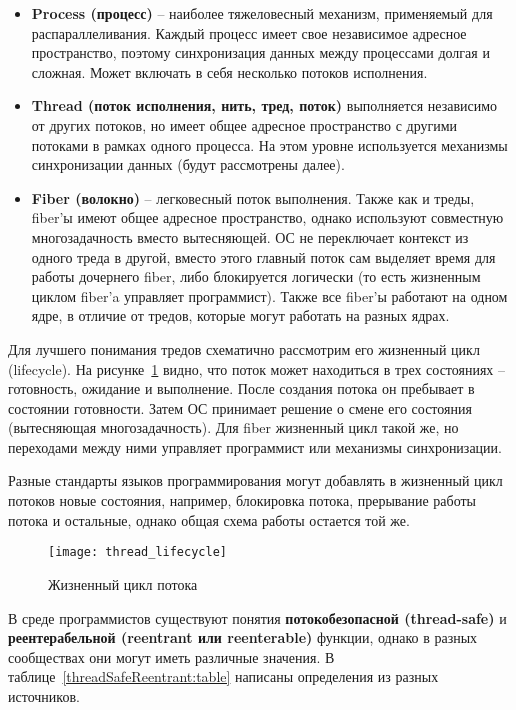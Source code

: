 \begin{itemize}
    \item\textbf{Process (процесс)} -- наиболее тяжеловесный механизм, применяемый для распараллеливания.
    Каждый процесс имеет свое независимое адресное пространство, поэтому синхронизация данных между процессами долгая и сложная.
    Может включать в себя несколько потоков исполнения.
    \item\textbf{Thread (поток исполнения, нить, тред, поток)} выполняется независимо от других потоков, но имеет общее адресное пространство с другими потоками в рамках одного процесса.
    На этом уровне используется механизмы синхронизации данных (будут рассмотрены далее).
    \item\textbf{Fiber (волокно)} -- легковесный поток выполнения.
    Также как и треды, fiber'ы имеют общее адресное пространство, однако используют совместную многозадачность вместо вытесняющей.
    ОС не переключает контекст из одного треда в другой, вместо этого главный поток сам выделяет время для работы дочернего fiber, либо блокируется логически (то есть жизненным циклом fiber'a управляет программист).
    Также все fiber'ы работают на одном ядре, в отличие от тредов, которые могут работать на разных ядрах.
\end{itemize}

Для лучшего понимания тредов схематично рассмотрим его жизненный цикл (lifecycle).
На рисунке~\ref{threadLifecycle:image} видно, что поток может находиться в трех состояниях -- готовность, ожидание и выполнение.
После создания потока он пребывает в состоянии готовности.
Затем ОС принимает решение о смене его состояния (вытесняющая многозадачность).
Для fiber жизненный цикл такой же, но переходами между ними управляет программист или механизмы синхронизации.

Разные стандарты языков программирования могут добавлять в жизненный цикл потоков новые состояния, например, блокировка потока, прерывание работы потока и остальные, однако общая схема работы остается той же.

\begin{figure}[H]
    \texttt{[image: thread\_lifecycle]}
    \caption{Жизненный цикл потока}
    \label{threadLifecycle:image}
\end{figure}

\sloppy
В среде программистов существуют понятия \textbf{потокобезопасной (thread-safe)} и \textbf{реентерабельной (reentrant или reenterable)} функции, однако в разных сообществах они могут иметь различные значения.
В таблице~\ref{threadSafeReentrant:table} написаны определения из разных источников.

